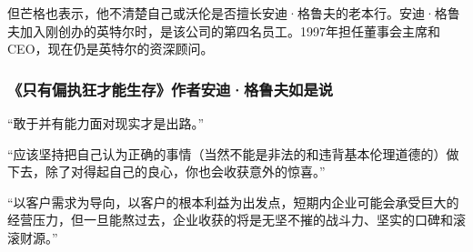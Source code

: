 但芒格也表示，他不清楚自己或沃伦是否擅长安迪·格鲁夫的老本行。安迪·格鲁夫加入刚创办的英特尔时，是该公司的第四名员工。1997年担任董事会主席和CEO，现在仍是英特尔的资深顾问。
\par

\subsubsection*{《只有偏执狂才能生存》作者安迪·格鲁夫如是说}

“敢于并有能力面对现实才是出路。”
\par

“应该坚持把自己认为正确的事情（当然不能是非法的和违背基本伦理道德的）做下去，除了对得起自己的良心，你也会收获意外的惊喜。”
\par

“以客户需求为导向，以客户的根本利益为出发点，短期内企业可能会承受巨大的经营压力，但一旦能熬过去，企业收获的将是无坚不摧的战斗力、坚实的口碑和滚滚财源。”
\par
